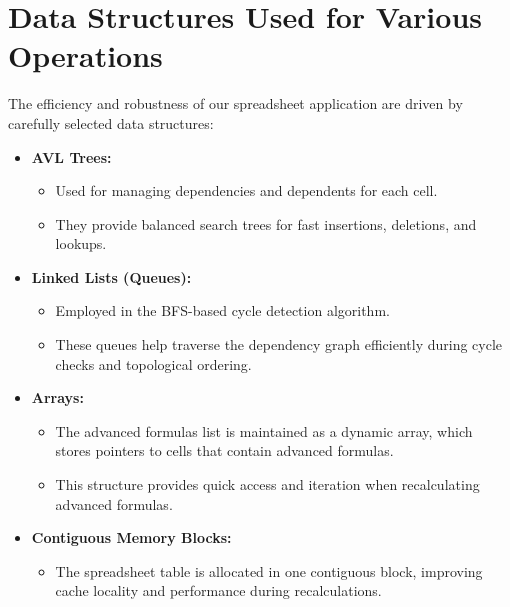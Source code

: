 \documentclass[12pt]{article}
\begin{document}
\section{Data Structures Used for Various Operations}
The efficiency and robustness of our spreadsheet application are driven by carefully selected data structures:
\begin{itemize}[noitemsep]
    \item \textbf{AVL Trees:}
    \begin{itemize}[noitemsep]
        \item Used for managing dependencies and dependents for each cell.
        \item They provide balanced search trees for fast insertions, deletions, and lookups.
    \end{itemize}
    \item \textbf{Linked Lists (Queues):}
    \begin{itemize}[noitemsep]
        \item Employed in the BFS-based cycle detection algorithm.
        \item These queues help traverse the dependency graph efficiently during cycle checks and topological ordering.
    \end{itemize}
    \item \textbf{Arrays:}
    \begin{itemize}[noitemsep]
        \item The advanced formulas list is maintained as a dynamic array, which stores pointers to cells that contain advanced formulas.
        \item This structure provides quick access and iteration when recalculating advanced formulas.
    \end{itemize}
    \newpage
    \item \textbf{Contiguous Memory Blocks:}
    \begin{itemize}[noitemsep]
        \item The spreadsheet table is allocated in one contiguous block, improving cache locality and performance during recalculations.
    \end{itemize}
\end{itemize}
\end{document}
